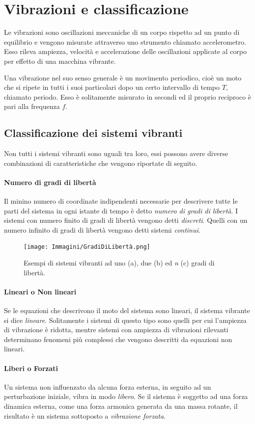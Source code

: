 \section{Vibrazioni e classificazione}
Le vibrazioni sono oscillazioni meccaniche di un corpo rispetto ad un punto di equilibrio e vengono misurate attraverso uno strumento chiamato accelerometro. 
Esso rileva ampiezza, velocità e accelerazione delle oscillazioni applicate al corpo per effetto di una macchina vibrante.

Una vibrazione nel suo senso generale è un movimento periodico, cioè un moto che si ripete in tutti i suoi particolari dopo un certo intervallo di tempo $T$, chiamato periodo. Esso è solitamente misurato in secondi ed il proprio reciproco è pari alla frequenza $f$.

\subsection{Classificazione dei sistemi vibranti}
Non tutti i sistemi vibranti sono uguali tra loro, essi possono avere diverse combinazioni di caratteristiche che vengono riportate di seguito.
\paragraph{Numero di gradi di libertà} Il minino numero di coordinate indipendenti necessarie per descrivere tutte le parti del sistema in ogni istante di tempo è detto \textit{numero di gradi di libertà}. I sistemi con numero finito di gradi di libertà vengono detti \textit{discreti}. Quelli con un numero infinito di gradi di libertà vengono detti sistemi \textit{continui}.
\begin{figure}[h]
    \centering
    \texttt{[image: Immagini/GradiDiLibertà.png]}
    \caption{Esempi di sistemi vibranti ad uno (a), due (b) ed \textit{n} (c) gradi di libertà.}
    \label{GradiDiLibertà}
\end{figure}
\paragraph{Lineari o Non lineari} Se le equazioni che descrivono il moto del sistema sono lineari, il sistema vibrante si dice \textit{lineare}. Solitamente i sistemi di questo tipo sono quelli per cui l'ampiezza di vibrazione è ridotta, mentre sistemi con ampiezza di vibrazioni rilevanti determinano fenomeni più complessi che vengono descritti da equazioni non lineari. 
\paragraph{Liberi o Forzati} Un sistema non influenzato da alcuna forza esterna, in seguito ad un perturbazione iniziale, vibra in modo \textit{libero}. Se il sistema è soggetto ad una forza dinamica esterna, come una forza armonica generata da una massa rotante, il risultato è un sistema sottoposto a \textit{vibrazione forzata}.
